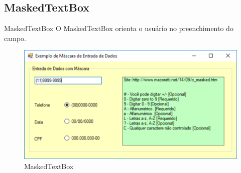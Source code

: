 

\subsection{MaskedTextBox}



\begin{frame}

\begin{CaixaModelo01}{MaskedTextBox}
	O MaskedTextBox orienta o usuário no preenchimento do campo.
		\begin{figure}
	\includegraphics[scale=.45]{./Figuras/F04_MaskeredText.png}
	\caption{MaskedTextBox }
	\label{fig:MaskedTextBox01}
\end{figure}

\end{CaixaModelo01}
\end{frame}
